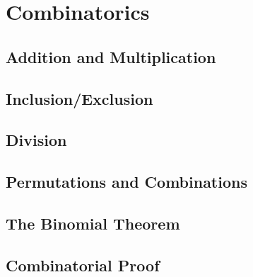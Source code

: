 \chapter{Combinatorics}

\section{Addition and Multiplication}
\section{Inclusion/Exclusion}
\section{Division}
\section{Permutations and Combinations}
\section{The Binomial Theorem}
\section{Combinatorial Proof}
